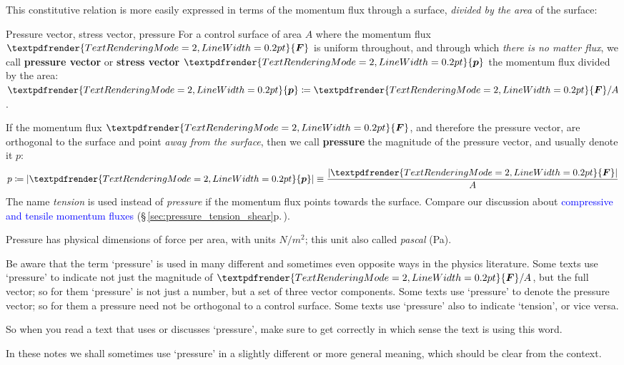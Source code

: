 \documentclass[a4paper,12pt,%
onecolumn,oneside,%
british%
]{memoir}
\renewcommand*{\bm}[1]{\textpdfrender{TextRenderingMode=2,LineWidth=0.2pt}{\boldsymbol{#1}}}
\newcommand*{\defd}{\coloneqq}
\DeclarePairedDelimiter\abs{\lvert}{\rvert}
\renewcommand*{\|}[1][]{\nonscript\:#1\vert\nonscript\:\mathopen{}}
\newcommand*{\sect}{\S}%
\renewcommand*{\autoref}[3][\sect\,\ref]{\textcolor{blue}{#3} {\color{blue}\scriptsize(\faIcon[regular]{eye}\;#1{#2}\;p.\,\pageref{#2})}}
\newcommand*{\yF}{\bm{F}}
\newcommand*{\ypr}{p} %
\newcommand*{\ypv}{\bm{\ypr}} %
\begin{document}
This constitutive relation is more easily expressed in terms of the momentum flux through a surface, \emph{divided by the area} of the surface:
\begin{definition}{{Pressure vector, stress vector, pressure}}
  For a control surface of area $A$ where the momentum flux $\yF$ is uniform throughout, and through which \emph{there is no matter flux}, we call \textbf{pressure vector} or \textbf{stress vector} $\ypv$ the momentum flux divided by the area: $\ypv \defd \yF/A$.

  \medskip

If the momentum flux $\yF$, and therefore the pressure vector, are orthogonal to the surface and point \emph{away from the surface}, then we call \textbf{pressure} the magnitude of the pressure vector, and usually denote it $\ypr$:
\begin{equation}
  \label{eq:pressure_def}
  \ypr \defd \abs{\ypv} \equiv \frac{\abs{\yF}}{A}
\end{equation}
The name \emph{tension} is used instead of \emph{pressure} if the momentum flux points towards the surface. Compare our discussion about \autoref{sec:pressure_tension_shear}{compressive and tensile momentum fluxes}.

\medskip

Pressure has physical dimensions of force per area, with units $\unit{N/m^{2}}$; this unit also called \emph{pascal} (\unit{Pa}).
\end{definition}

\begin{warning}
  Be aware that the term \enquote*{pressure} is used in many different and sometimes even opposite ways in the physics literature. Some texts use \enquote*{pressure} to indicate not just the magnitude of $\yF/A$, but the full vector; so for them \enquote*{pressure} is not just a number, but a set of three vector components. Some texts use \enquote*{pressure} to denote the pressure vector; so for them a pressure need not be orthogonal to a control surface. Some texts use \enquote*{pressure} also to indicate \enquote*{tension}, or vice versa.

  So when you read a text that uses or discusses \enquote*{pressure}, make sure to get correctly in which sense the text is using this word.

  In these notes we shall sometimes use \enquote*{pressure} in a slightly different or more general meaning, which should be clear from the context.
\end{warning}
\end{document}
